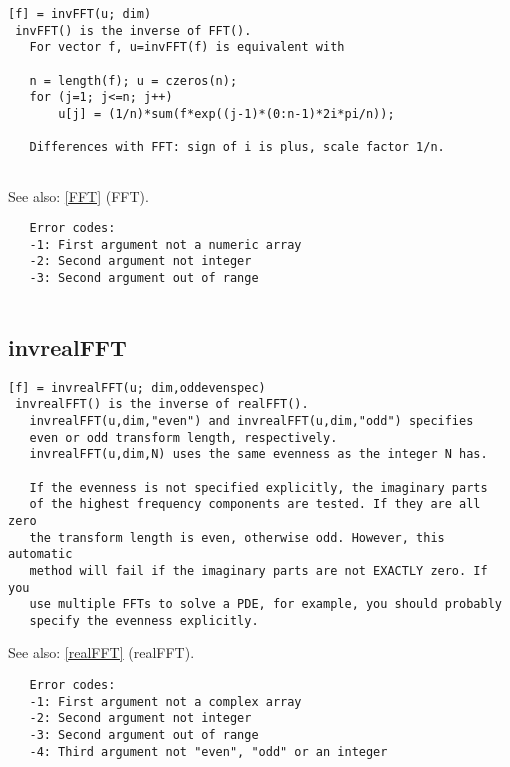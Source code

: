 \documentclass[a4paper]{article}
\begin{document}
\begin{tscreen}
\begin{verbatim}
[f] = invFFT(u; dim)
 invFFT() is the inverse of FFT().
   For vector f, u=invFFT(f) is equivalent with

   n = length(f); u = czeros(n);
   for (j=1; j<=n; j++)
       u[j] = (1/n)*sum(f*exp((j-1)*(0:n-1)*2i*pi/n));

   Differences with FFT: sign of i is plus, scale factor 1/n.
   
\end{verbatim}

See also: \ref{FFT} {(FFT)}.
\begin{verbatim}
   Error codes:
   -1: First argument not a numeric array
   -2: Second argument not integer
   -3: Second argument out of range
   
\end{verbatim}
\end{tscreen}



\subsection{invrealFFT\label{invrealFFT}}

\begin{tscreen}
\begin{verbatim}
[f] = invrealFFT(u; dim,oddevenspec)
 invrealFFT() is the inverse of realFFT().
   invrealFFT(u,dim,"even") and invrealFFT(u,dim,"odd") specifies
   even or odd transform length, respectively.
   invrealFFT(u,dim,N) uses the same evenness as the integer N has.

   If the evenness is not specified explicitly, the imaginary parts
   of the highest frequency components are tested. If they are all zero
   the transform length is even, otherwise odd. However, this automatic
   method will fail if the imaginary parts are not EXACTLY zero. If you
   use multiple FFTs to solve a PDE, for example, you should probably
   specify the evenness explicitly.
\end{verbatim}

See also: \ref{realFFT} {(realFFT)}.
\begin{verbatim}
   Error codes:
   -1: First argument not a complex array
   -2: Second argument not integer
   -3: Second argument out of range
   -4: Third argument not "even", "odd" or an integer
   
\end{verbatim}
\end{tscreen}
\end{document}
